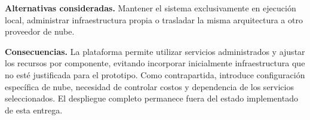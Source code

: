 \textbf{Alternativas consideradas.} Mantener el sistema exclusivamente en ejecución local, administrar infraestructura propia o trasladar la misma arquitectura a otro proveedor de nube.

\textbf{Consecuencias.} La plataforma permite utilizar servicios administrados y ajustar los recursos por componente, evitando incorporar inicialmente infraestructura que no esté justificada para el prototipo. Como contrapartida, introduce configuración específica de nube, necesidad de controlar costos y dependencia de los servicios seleccionados. El despliegue completo permanece fuera del estado implementado de esta entrega.
